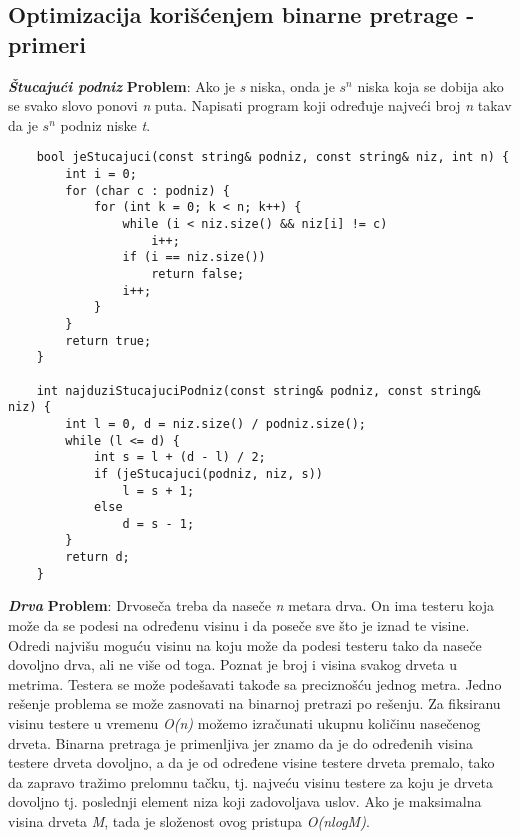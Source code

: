 \documentclass{article}
\begin{document}
\subsection{Optimizacija korišćenjem binarne pretrage - primeri}
\textit{\textbf{Štucajući podniz}}
\vspace{0.1cm}\newline
\textbf{Problem}: Ako je \textit{s} niska, onda je $s^n$ niska koja se dobija ako se svako slovo
ponovi \textit{n} puta. Napisati program koji određuje
najveći broj \textit{n} takav da je $s^n$ podniz niske \textit{t}.
\begin{lstlisting}
    bool jeStucajuci(const string& podniz, const string& niz, int n) {
        int i = 0;
        for (char c : podniz) {
            for (int k = 0; k < n; k++) {
                while (i < niz.size() && niz[i] != c)
                    i++;
                if (i == niz.size())
                    return false;
                i++;
            }
        }
        return true;
    }
    
    int najduziStucajuciPodniz(const string& podniz, const string& niz) {
        int l = 0, d = niz.size() / podniz.size();
        while (l <= d) {
            int s = l + (d - l) / 2;
            if (jeStucajuci(podniz, niz, s))
                l = s + 1;
            else
                d = s - 1;
        }
        return d;
    }
\end{lstlisting}
\vspace{0.1cm}
\textit{\textbf{Drva}}
\vspace{0.1cm}\newline
\textbf{Problem}: Drvoseča treba da naseče \textit{n} metara drva. On ima testeru koja može
da se podesi na određenu visinu i da poseče sve što je iznad te visine. Odredi
najvišu moguću visinu na koju može da podesi testeru tako da naseče dovoljno
drva, ali ne više od toga. Poznat je broj i visina svakog drveta u metrima. Testera se može podešavati takođe sa preciznošću jednog metra.
\newline
Jedno rešenje problema se može zasnovati na binarnoj pretrazi po rešenju. Za fiksiranu visinu
testere u vremenu \textit{O(n)} možemo izračunati ukupnu količinu nasečenog drveta.
Binarna pretraga je primenljiva jer znamo da je do određenih visina testere
drveta dovoljno, a da je od određene visine testere drveta premalo, tako da
zapravo tražimo prelomnu tačku, tj. najveću visinu testere za koju je drveta
dovoljno tj. poslednji element niza koji zadovoljava uslov. Ako je maksimalna
visina drveta \textit{M}, tada je složenost ovog pristupa \textit{O(nlogM)}.
\end{document}
